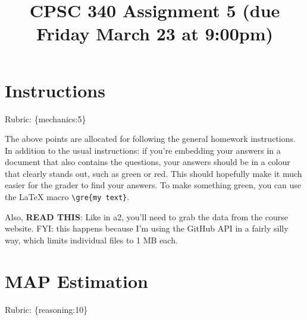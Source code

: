 \documentclass{article}
\def\rubric#1{\gre{Rubric: \{#1\}}}{}
\def\gre#1{{\color{gre}#1}}
\def\red#1{{\color{red}#1}}
\begin{document}
\title{CPSC 340 Assignment 5 (due Friday March 23 at 9:00pm)}
\date{}
\maketitle

\vspace{-7em}

\section*{Instructions}
\rubric{mechanics:5}

The above points are allocated for following the general homework instructions. In addition to the usual instructions:
if you're embedding your answers in a document that also contains the questions,
your answers should be in a colour that clearly stands out, such as
\gre{green} or \red{red}. This should hopefully make it much easier for the grader to find
your answers. To make something green, you can use the LaTeX macro \verb|\gre{my text}|.

Also, \textbf{\red{READ THIS}}: Like in a2, you'll need to grab the data from the course website. FYI: this happens because I'm using the GitHub API in a fairly silly way, which limits individual files to 1 MB each. 

\vspace{1em}


\section{MAP Estimation}
\rubric{reasoning:10}
\end{document}
